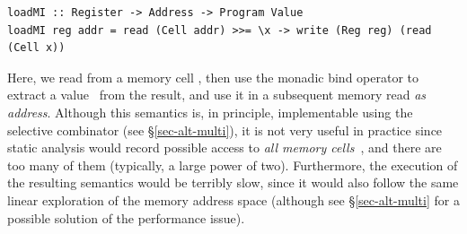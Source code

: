 \vspace{1mm}
\begin{verbatim}
loadMI :: Register -> Address -> Program Value
loadMI reg addr = read (Cell addr) >>= \x -> write (Reg reg) (read (Cell x))
\end{verbatim}
\vspace{1mm}

\noindent
Here, we read from a memory cell , then use the monadic bind operator
to extract a value~ from the result, and use it in a subsequent memory
read \emph{as address}. Although this semantics is, in principle, implementable
using the selective  combinator (see \S\ref{sec-alt-multi}), it is not
very useful in practice since static analysis would record possible access to
\emph{all memory cells}~, and there are too many of them (typically, a
large power of two). Furthermore, the execution of the resulting semantics would
be terribly slow, since it would also follow the same linear exploration of the
memory address space (although see \S\ref{sec-alt-multi} for a possible solution
of the performance issue).

